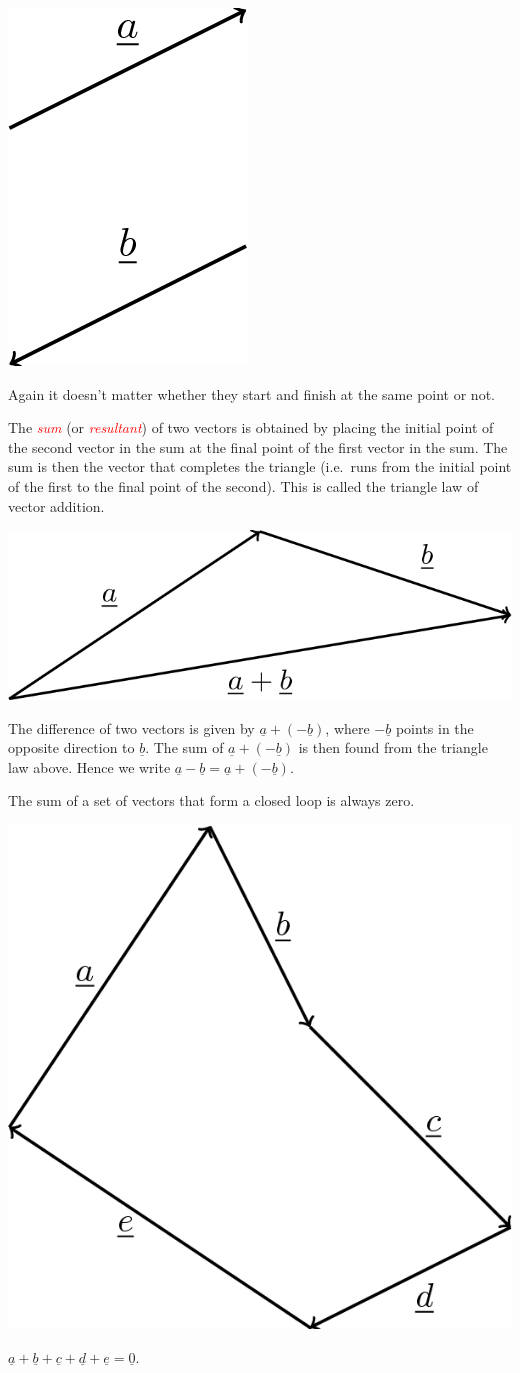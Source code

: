 \documentclass[
  11pt,
  oneside]{book}
\theoremstyle{definition}
\theoremstyle{definition}
\theoremstyle{definition}
\theoremstyle{definition}
\theoremstyle{remark}
\begin{document}
\begin{center}\includegraphics[width=0.1\linewidth]{tikztopng-figure50} \end{center}

Again it doesn't matter whether they start and finish at the same point or not.

The \textcolor{red}{\em sum} (or \textcolor{red}{\em resultant}) of two vectors is obtained by placing the initial point of the second vector in the sum at the final point of the first vector in the sum. The sum is then the vector that completes the triangle (i.e.~runs from the initial point of the first to the final point of the second). This is called the triangle law of vector addition.

\begin{center}\includegraphics[width=0.3\linewidth]{tikztopng-figure51} \end{center}

The difference of two vectors is given by \(\underline a + (-\underline b)\), where \(-\underline b\) points in the opposite direction to \(\underline b\). The sum of \(\underline a + (-\underline b)\) is then found from the triangle law above. Hence we write \(\underline a-\underline b = \underline a + (-\underline b)\).

The sum of a set of vectors that form a closed loop is always zero.

\begin{center}\includegraphics[width=0.3\linewidth]{tikztopng-figure52} \end{center}

\(\underline a + \underline b + \underline c + \underline d + \underline e = \underline 0\).
\end{document}
